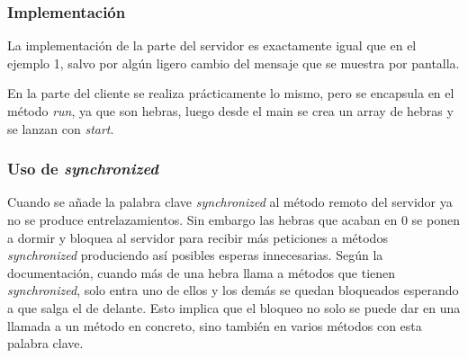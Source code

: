 \documentclass{article}
\begin{document}
\subsubsection{Implementación}
La implementación de la parte del servidor es exactamente igual que en el ejemplo 1, salvo por algún ligero cambio del mensaje que se muestra por pantalla.

En la parte del cliente se realiza prácticamente lo mismo, pero se encapsula en el método \textit{run}, ya que son hebras, luego desde el main se crea un array de hebras y se lanzan con \textit{start}.

\subsubsection{Uso de \textit{synchronized}}
Cuando se añade la palabra clave \textit{synchronized} al método remoto del servidor ya no se produce entrelazamientos. Sin embargo las hebras que acaban en 0 se ponen a dormir y bloquea al servidor para recibir más peticiones a métodos \textit{synchronized} produciendo así posibles esperas innecesarias. Según la documentación, cuando más de una hebra llama a métodos que tienen \textit{synchronized}, solo entra uno de ellos y los demás se quedan bloqueados esperando a que salga el de delante. Esto implica que el bloqueo no solo se puede dar en una llamada a un método en concreto, sino también en varios métodos con esta palabra clave.
\end{document}
